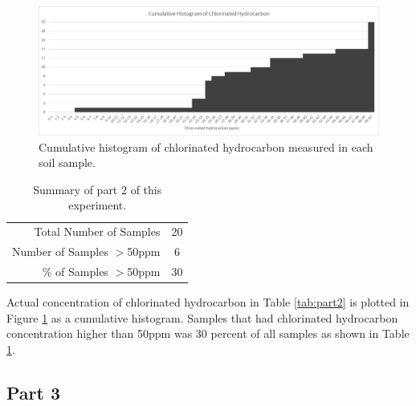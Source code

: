 \documentclass{article}
\begin{document}
\begin{figure}[h!]
	\centering
	\includegraphics[width=1\linewidth]{part2}
	\caption[Part 2 Summary]{Cumulative histogram of chlorinated hydrocarbon measured in each soil sample.}
	\label{fig:part2sum}
\end{figure}

\begin{table}[h!]
	\begin{center}
		\begin{tabular}{r|c}
			Total Number of Samples & 20 \\
			Number of Samples $>$50ppm & 6 \\ \hline
			\% of Samples $>$50ppm & 30 \\
		\end{tabular}
		\caption[Part 1 Summary]{Summary of part 2 of this experiment.}
		\label{tab:part2sum}
	\end{center}
\end{table}

Actual concentration of chlorinated hydrocarbon in Table \ref{tab:part2} is plotted in Figure \ref{fig:part2sum} as a cumulative histogram. Samples that had chlorinated hydrocarbon concentration higher than 50ppm was 30 percent of all samples as shown in Table \ref{tab:part2sum}.

\subsection{Part 3}
\end{document}
